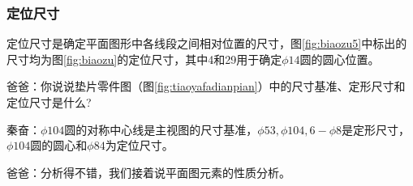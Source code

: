 \subsubsection{定位尺寸} 

定位尺寸是确定平面图形中各线段之间相对位置的尺寸，图\ref{fig:biaozu5}中标出的尺寸均为图\ref{fig:biaozu}的定位尺寸，其中4和29用于确定$\phi 14$圆的圆心位置。

爸爸：你说说垫片零件图（图\ref{fig:tiaoyafadianpian}）中的尺寸基准、定形尺寸和定位尺寸是什么?

秦奋：$\phi 104$圆的对称中心线是主视图的尺寸基准，$\phi 53,\phi 104,6-\phi 8$是定形尺寸，$\phi 104$圆的圆心和$\phi 84$为定位尺寸。

爸爸：分析得不错，我们接着说平面图元素的性质分析。
\endinput